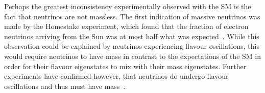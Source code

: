 
Perhaps the greatest inconsistency experimentally observed with the SM is the fact that neutrinos are not massless.
The first indication of massive neutrinos was made by the Homestake experiment, which found that the fraction of electron neutrinos arriving from the Sun was at most half what was expected~\cite{PhysRevLett.20.1205}.
While this observation could be explained by neutrinos experiencing flavour oscillations, this would require neutrinos to have mass in contrast to the expectations of the SM in order for their flavour eigenstates to mix with their mass eigenstates.
Further experiments have confirmed however, that neutrinos do undergo flavour oscillations and thus must have mass~\cite{Fukuda:1998mi,Ahmad:2001an,PhysRevD.88.032002}.

%
